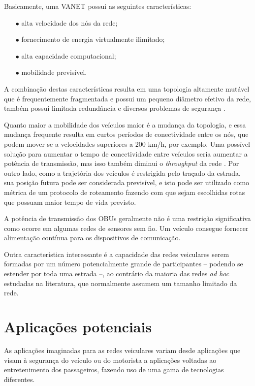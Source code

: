 Basicamente, uma VANET possui as seguintes características:
\begin{enumerate}
  \item[$\bullet$] alta velocidade dos nós da rede;
  \item[$\bullet$] fornecimento de energia virtualmente ilimitado;
  \item[$\bullet$] alta capacidade computacional;
  \item[$\bullet$] mobilidade previsível.
\end{enumerate}

A combinação destas características resulta em uma topologia altamente
mutável que é frequentemente fragmentada e possui um pequeno diâmetro
efetivo da rede, também possui limitada redundância e diversos problemas
de segurança \cite{raya2006securing, dotzer2006privacy, golle2004detecting}.

Quanto maior a mobilidade dos veículos maior é a mudança da topologia,
e essa mudança frequente resulta em curtos períodos de conectividade
entre os nós, que podem mover-se a velocidades superiores a 200 km/h,
por exemplo. Uma possível solução para aumentar o tempo de conectividade
entre veículos seria aumentar a potência de transmissão, mas isso também
diminui o \textit{throughput} da rede \cite{khorashadi2007impact,chen2007impact}.
Por outro lado, como a trajetória dos veículos é restrigida pelo traçado
da estrada, sua posição futura pode ser considerada previsível, e isto pode
ser utilizado como métrica de um protocolo de roteamento fazendo com que
sejam escolhidas rotas que possuam maior tempo de vida previsto.

A potência de transmissão dos OBUs geralmente não é uma restrição significativa
como ocorre em algumas redes de sensores sem fio. Um veículo consegue fornecer
alimentação contínua para os dispositivos de comunicação.

Outra característica interessante é a capacidade das redes veiculares
serem formadas por um número potencialmente grande de participantes --
podendo se estender por toda uma estrada --, ao contrário da maioria
das redes \textit{ad hoc} estudadas na literatura, que normalmente assumem um
tamanho limitado da rede.

\section{Aplicações potenciais}
As aplicações imaginadas para as redes veiculares variam desde aplicações que
visam à segurança do veículo ou do motorista a aplicações voltadas ao
entretenimento dos passageiros, fazendo uso de uma gama de tecnologias
diferentes.

